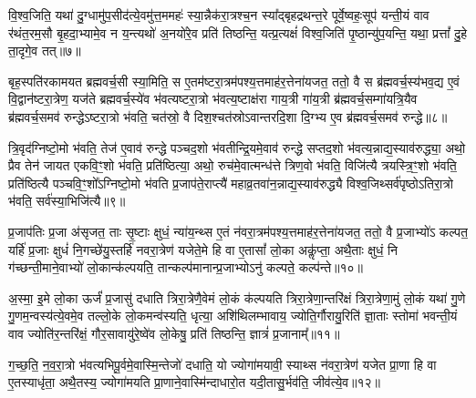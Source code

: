 वि॒श्व॒जिति॒ यथा॑ दु॒ग्धामु॑प॒सीद॑त्ये॒वमु॑त्त॒ममहः॑ स्या॒न्नैक॑रा॒त्रश्च॒न स्या᳚द्बृहद्रथन्त॒रे पूर्वे॒ष्वहः॒सूप॑ यन्ती॒यं वाव र॑थंत॒रम॒सौ बृ॒हदा॒भ्यामे॒व न य॒न्त्यथो॑ अ॒नयो॑रे॒व प्रति॑ तिष्ठन्ति॒ यत्प्र॒त्यक्षं॑ विश्व॒जिति॑ पृ॒ष्ठान्यु॑प॒यन्ति॒ यथा॒ प्रत्तां᳚ दु॒हे ता॒दृगे॒व तत्॥७॥

{\anuvakamend[{तेज॑ उपे॒युः प्र॒त्यक्षं॒ द्विच॑त्वारिꣳशच्च॥२॥}]}

बृह॒स्पति॑रकामयत ब्रह्मवर्च॒सी स्या॒मिति॒ स ए॒तम॑ष्टरा॒त्रम॑पश्य॒त्तमाह॑र॒त्तेना॑यजत॒ ततो॒ वै स ब्र॑ह्मवर्च॒स्य॑भव॒द्य ए॒वं वि॒द्वान॑ष्टरा॒त्रेण॒ यज॑ते ब्रह्मवर्च॒स्ये॑व भ॑वत्यष्टरा॒त्रो भ॑वत्य॒ष्टाक्ष॑रा गाय॒त्री गा॑य॒त्री ब्र॑ह्मवर्च॒सम्गा॑यत्रि॒यैव ब्र॑ह्मवर्च॒समव॑ रुन्द्धे\-ऽष्टरा॒त्रो भ॑वति॒ चत॑स्रो॒ वै दिश॒श्चत॑स्रो\-ऽवान्तरदि॒शा दि॒ग्भ्य ए॒व ब्र॑ह्मवर्च॒समव॑ रुन्द्धे॥८॥

त्रि॒वृद॑ग्निष्टो॒मो भ॑वति॒ तेज॑ ए॒वाव॑ रुन्द्धे पञ्चद॒शो भ॑वतीन्द्रि॒यमे॒वाव॑ रुन्द्धे सप्तद॒शो भ॑वत्य॒न्नाद्य॒स्याव॑रुद्ध्या॒ अथो॒ प्रैव तेन॑ जायत एकवि॒ꣳ॒शो भ॑वति॒ प्रति॑ष्ठित्या॒ अथो॒ रुच॑मे॒वात्मन्ध॑त्ते त्रिण॒वो भ॑वति॒ विजि॑त्यै त्रयस्त्रि॒ꣳ॒शो भ॑वति॒ प्रति॑ष्ठित्यै पञ्चवि॒ꣳ॒शो᳚\-ऽग्निष्टो॒मो भ॑वति प्र॒जाप॑ते॒राप्त्यै॑ महाव्र॒तवा॑न॒न्नाद्य॒स्याव॑रुद्ध्यै विश्व॒जिथ्सर्व॑पृष्ठो\-ऽतिरा॒त्रो भ॑वति॒ सर्व॑स्या॒भिजि॑त्यै॥९॥

{}

प्र॒जाप॑तिः प्र॒जा अ॑सृजत॒ ताः सृ॒ष्टाः क्षुधं॒ न्या॑य॒न्थ्स ए॒तं न॑वरा॒त्रम॑पश्य॒त्तमाह॑र॒त्तेना॑यजत॒ ततो॒ वै प्र॒जाभ्यो॑\-ऽ कल्पत॒ यर्\mbox{}हि॑ प्र॒जाः क्षुधं॑ नि॒गच्छे॑यु॒स्तर्\mbox{}हि॑ नवरा॒त्रेण॑ यजेते॒मे हि वा ए॒तासां᳚ लो॒का अकॢ॑प्ता॒ अथै॒ताः क्षुधं॒ नि ग॑च्छन्ती॒माने॒वाभ्यो॑ लो॒कान्क॑ल्पयति॒ तान्कल्प॑मानान्प्र॒जाभ्यो\-ऽनु॑ कल्पते॒ कल्प॑न्ते॥१०॥

अ॒स्मा॒ इ॒मे लो॒का ऊर्जं॑ प्र॒जासु॑ दधाति त्रिरा॒त्रेणै॒वेमं लो॒कं क॑ल्पयति त्रिरा॒त्रेणा॒न्तरि॑क्षं त्रिरा॒त्रेणा॒मुं लो॒कं यथा॑ गु॒णे गु॒णम॒न्वस्य॑त्ये॒वमे॒व तल्लो॒के लो॒कमन्व॑स्यति॒ धृत्या॒ अशि॑थिलम्भावाय॒ ज्योति॒र्गौरायु॒रिति॑ ज्ञा॒ताः स्तोमा॑ भवन्ती॒यं वाव ज्योति॑र॒न्तरि॑क्षं॒ गौर॒सावायु॑रे॒ष्वे॑व लो॒केषु॒ प्रति॑ तिष्ठन्ति॒ ज्ञात्रं॑ प्र॒जानाम्᳚॥११॥

ग॒च्छ॒ति॒ न॒व॒रा॒त्रो भ॑वत्यभिपू॒र्वमे॒वास्मि॒न्तेजो॑ दधाति॒ यो ज्योगा॑मयावी॒ स्याथ्स न॑वरा॒त्रेण॑ यजेत प्रा॒णा हि वा ए॒तस्याधृ॑ता॒ अथै॒तस्य॒ ज्योगा॑मयति प्रा॒णाने॒वास्मि॑न्दाधारो॒त यदी॒तासु॒र्भव॑ति॒ जीव॑त्ये॒व॥१२॥

{\anuvakamend[{कल्प॑न्ते प्र॒जाना॒न्त्रय॑स्त्रिꣳशच्च॥४॥}]}

